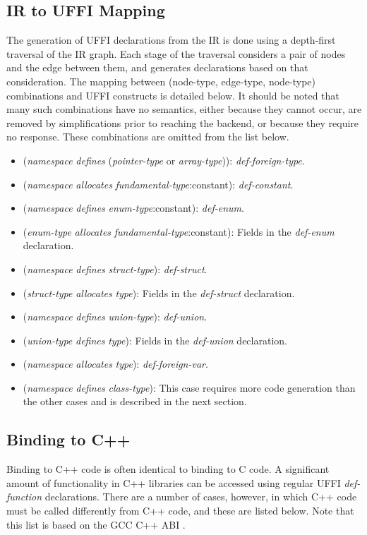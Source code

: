 \documentclass[12pt]{article}
\begin{document}
\subsection{IR to UFFI Mapping}
The generation of UFFI declarations from the IR is done using a depth-first traversal of the IR graph. Each stage of the traversal considers a pair of nodes and the edge between them, and generates declarations based on that consideration. The mapping between (node-type, edge-type, node-type) combinations and UFFI constructs is detailed below. It should be noted that many such combinations have no semantics, either because they cannot occur, are removed by simplifications prior to reaching the backend, or because they require no response. These combinations are omitted from the list below. 

\begin{itemize}
\item (\emph{namespace} \emph{defines} (\emph{pointer-type} or \emph{array-type})): \emph{def-foreign-type}. 
\item (\emph{namespace} \emph{allocates} \emph{fundamental-type}:constant): \emph{def-constant}. 
\item (\emph{namespace} \emph{defines} \emph{enum-type}:constant): \emph{def-enum}.
\item (\emph{enum-type} \emph{allocates} \emph{fundamental-type}:constant): Fields in the \emph{def-enum} declaration.
\item (\emph{namespace} \emph{defines} \emph{struct-type}): \emph{def-struct}.
\item (\emph{struct-type} \emph{allocates} \emph{type}): Fields in the \emph{def-struct} declaration.
\item (\emph{namespace} \emph{defines} \emph{union-type}): \emph{def-union}.
\item (\emph{union-type} \emph{defines} \emph{type}): Fields in the \emph{def-union} declaration. 
\item (\emph{namespace} \emph{allocates} \emph{type}): \emph{def-foreign-var}. 
\item (\emph{namespace} \emph{defines} \emph{class-type}): This case requires more code generation than the other cases and is described in the next section.
\end{itemize}

\subsection{Binding to C++}
Binding to C++ code is often identical to binding to C code. A significant amount of functionality in C++ libraries can be accessed using regular UFFI \emph{def-function} declarations. There are a number of cases, however, in which C++ code must be called differently from C++ code, and these are listed below. Note that this list is based on the GCC C++ ABI \cite{ABI}. 
\end{document}

